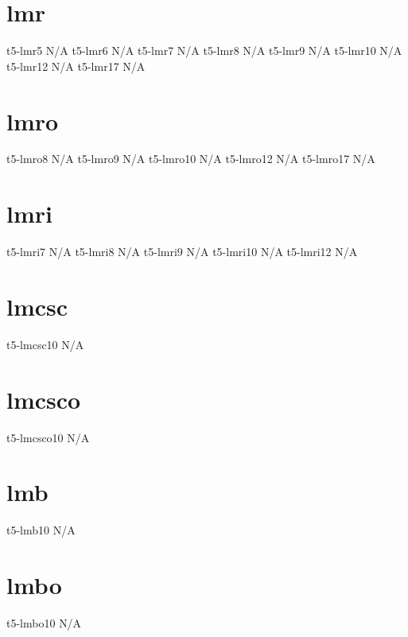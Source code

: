 \documentclass[sample]{vnsample}
\begin{document}
\section{lmr}
      {t5-lmr5}            {N/A}
      {t5-lmr6}            {N/A}
      {t5-lmr7}            {N/A}
      {t5-lmr8}            {N/A}
      {t5-lmr9}            {N/A}
      {t5-lmr10}           {N/A}
      {t5-lmr12}           {N/A}
      {t5-lmr17}           {N/A}

\section{lmro}
     {t5-lmro8}           {N/A}
     {t5-lmro9}           {N/A}
     {t5-lmro10}          {N/A}
     {t5-lmro12}          {N/A}
     {t5-lmro17}          {N/A}

\section{lmri}
     {t5-lmri7}           {N/A}
     {t5-lmri8}           {N/A}
     {t5-lmri9}           {N/A}
     {t5-lmri10}          {N/A}
     {t5-lmri12}          {N/A}

\section{lmcsc}
     {t5-lmcsc10}         {N/A}

\section{lmcsco}
   {t5-lmcsco10}        {N/A}

\section{lmb}
      {t5-lmb10}           {N/A}

\section{lmbo}
     {t5-lmbo10}          {N/A}
\end{document}
